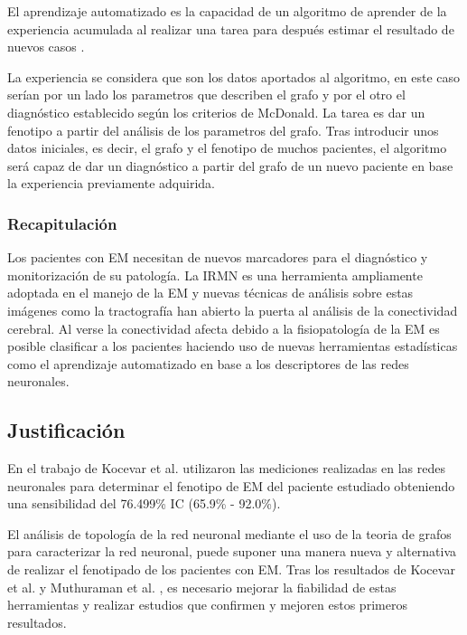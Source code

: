 \documentclass[fleqn,12pt]{uicarticle} %
\begin{document}
El aprendizaje automatizado es la capacidad de un algoritmo de aprender de la experiencia acumulada al realizar una tarea para después estimar el resultado de nuevos casos \cite{Friedman1997}.

La experiencia se considera que son los datos aportados al algoritmo, en este caso serían por un lado los parametros que describen el grafo y  por el otro el diagnóstico establecido según los criterios de McDonald. La tarea es dar un fenotipo a partir del análisis de los parametros del grafo. Tras introducir unos datos iniciales, es decir, el grafo y el fenotipo de muchos pacientes, el algoritmo será capaz de dar un diagnóstico a partir del grafo de un nuevo paciente en base la experiencia previamente adquirida.

\subsubsection{Recapitulación}

Los pacientes con EM necesitan de nuevos marcadores para el diagnóstico y monitorización de su patología. La IRMN es una herramienta ampliamente adoptada en el manejo de la EM y nuevas técnicas de análisis sobre estas imágenes como la tractografía han abierto la puerta al análisis de la conectividad cerebral. Al verse la conectividad afecta debido a la fisiopatología de la EM es posible clasificar a los pacientes haciendo uso de nuevas herramientas estadísticas como el aprendizaje automatizado en base a los descriptores de las redes neuronales.

\subsection{Justificación}

En el trabajo de Kocevar et al.\cite{Kocevar2016} utilizaron las mediciones realizadas en las redes neuronales para determinar el fenotipo de EM del paciente estudiado obteniendo una sensibilidad del 76.499\% IC (65.9\% - 92.0\%).

El análisis de topología de la red neuronal mediante el uso de la teoria de grafos para caracterizar la red neuronal, puede suponer una manera nueva y alternativa de realizar el fenotipado de los pacientes con EM. Tras los resultados de Kocevar et al.\cite{Kocevar2016} y Muthuraman et al. \cite{Muthuraman2016}, es necesario mejorar la fiabilidad de estas herramientas y realizar estudios que confirmen y mejoren estos primeros resultados.
\end{document}

